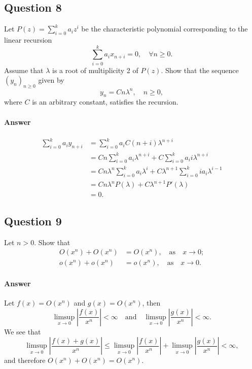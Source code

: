 \subsection{Question 8}
Let $ P(z) = \sum_{i=0}^{k} a_i z^i $ be the characteristic polynomial
    corresponding to the linear recursion
\begin{equation*}
    \sum_{i=0}^{k} a_i x_{n + i} = 0, \quad \forall n \geq 0.
\end{equation*}
Assume that $ \lambda $ is a root of multiplicity 2 of $ P(z) $.
Show that the sequence $ (y_n)_{n \geq 0} $ given by
\begin{equation*}
    y_n = C n \lambda^n, \quad n \geq 0,
\end{equation*}
where $ C $ is an arbitrary constant, satisfies the recursion.

\paragraph{Answer}
\begin{align*}
    \sum_{i=0}^{k} a_i y_{n + i}
        &= \sum_{i=0}^{k} a_i C (n + i) \lambda^{n + i} \\
        &= C n \sum_{i=0}^{k} a_i \lambda^{n + i} + C \sum_{i=0}^{k} a_i i
            \lambda^{n + i} \\
        &= C n \lambda^n \sum_{i=0}^{k} a_i \lambda^i + C \lambda^{n + 1}
            \sum_{i=0}^{k} i a_i \lambda^{i - 1} \\
        &= C n \lambda^n P(\lambda) + C \lambda^{n + 1} P'(\lambda) \\
        &= 0.
\end{align*}

\subsection{Question 9}
Let $ n > 0 $. Show that
\begin{align*}
    O(x^n) + O(x^n) &= O(x^n), \quad \text{as} \quad x \rightarrow 0; \\
    o(x^n) + o(x^n) &= o(x^n), \quad \text{as} \quad x \rightarrow 0.
\end{align*}

\paragraph{Answer}
Let $ f(x) = O(x^n) $ and $ g(x) = O(x^n) $, then
\begin{equation*}
    \limsup_{x \rightarrow 0} \left| \frac{f(x)}{x^n} \right| < \infty \quad
        \text{and} \quad \limsup_{x \rightarrow 0} \left| \frac{g(x)}{x^n}
        \right| < \infty.
\end{equation*}
We see that
\begin{equation*}
    \limsup_{x \rightarrow 0} \left| \frac{f(x) + g(x)}{x^n} \right| \leq
        \limsup_{x \rightarrow 0} \left| \frac{f(x)}{x^n} \right| +
        \limsup_{x \rightarrow 0} \left| \frac{g(x)}{x^n} \right| < \infty,
\end{equation*}
and therefore $ O(x^n) + O(x^n) = O(x^n) $.

